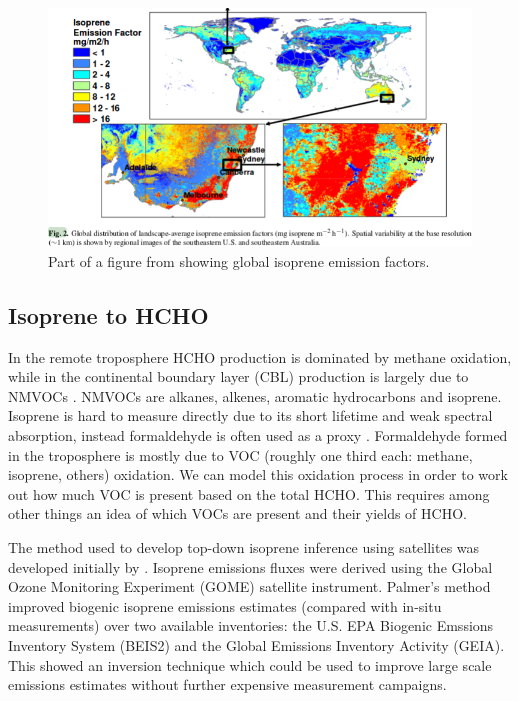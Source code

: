     
    \begin{figure}
      \includegraphics{Figures/MeganIsoprene1.png}
      \caption{ Part of a figure from \citet{Guenther2006} showing global isoprene emission factors. }
      \label{ch_LitRev:fig:meganisoprene}
    \end{figure}
    
  \subsection{Isoprene to HCHO}
    \label{ch_LitRev:sec:IsopFromHCHO}
    In the remote troposphere HCHO production is dominated by methane oxidation, while in the continental boundary layer (CBL) production is largely due to NMVOCs \citep{Abbot2003, Kefauver2014}.
    NMVOCs are alkanes, alkenes, aromatic hydrocarbons and isoprene.
    Isoprene is hard to measure directly due to its short lifetime and weak spectral absorption, instead formaldehyde is often used as a proxy \citep{Millet2006, Dufour2009, Marais2012, bauwens2013satellite, Kefauver2014, Bauwens2016}.
    Formaldehyde formed in the troposphere is mostly due to VOC (roughly one third each: methane, isoprene, others) oxidation.
    We can model this oxidation process in order to work out how much VOC is present based on the total HCHO.
    This requires among other things an idea of which VOCs are present and their yields of HCHO.
    
    The method used to develop top-down isoprene inference using satellites was developed initially by \citet{Palmer2001, Palmer2003}. 
    Isoprene emissions fluxes were derived using the Global Ozone Monitoring Experiment (GOME) satellite instrument.
    Palmer's method improved biogenic isoprene emissions estimates (compared with in-situ measurements) over two available inventories: the U.S. EPA Biogenic Emssions Inventory System (BEIS2) and the Global Emissions Inventory Activity (GEIA).
    This showed an inversion technique which could be used to improve large scale emissions estimates without further expensive measurement campaigns.
    
